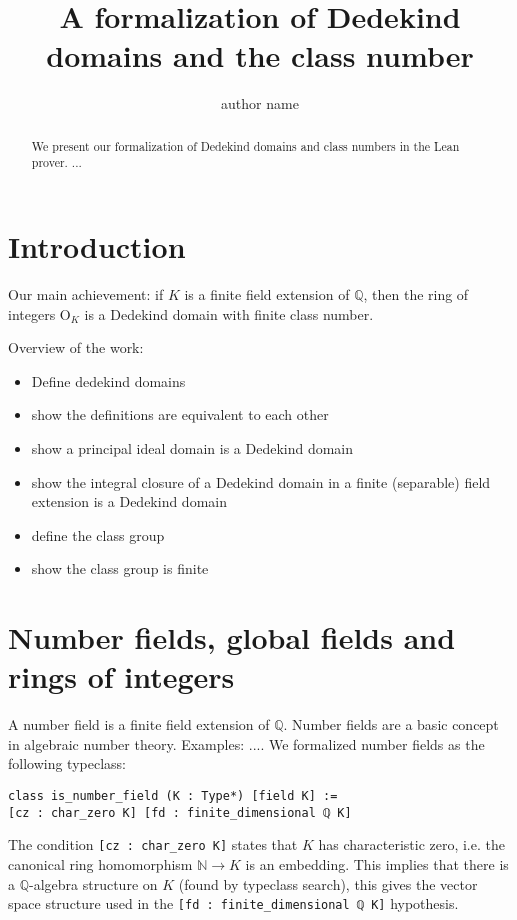 \documentclass{lipics-v2021}
\title{A formalization of Dedekind domains and the class number}
\author{author name}{affiliation}{email}{orcid}{funding}
\newcommand{\lean}[1]{\texttt{#1}\xspace} %
\newcommand{\OK}{\mathrm{O}_K}
\newcommand{\N}{\mathbb{N}}
\newcommand{\Q}{\mathbb{Q}}
\begin{document}
\maketitle

\begin{abstract}
We present our formalization of Dedekind domains and class numbers in the Lean prover. ...
\end{abstract}

\section{Introduction}

Our main achievement: if $K$ is a finite field extension of $\Q$, then the ring of integers $\OK$ is a Dedekind domain with finite class number.

Overview of the work:
\begin{itemize}
 \item Define dedekind domains
 \item show the definitions are equivalent to each other
 \item show a principal ideal domain is a Dedekind domain
 \item show the integral closure of a Dedekind domain in a finite (separable) field extension is a Dedekind domain
 \item define the class group
 \item show the class group is finite
\end{itemize}

\section{Number fields, global fields and rings of integers}

A number field is a finite field extension of $\Q$.
Number fields are a basic concept in algebraic number theory. Examples: ....
We formalized number fields as the following typeclass:
\begin{lstlisting}
class is_number_field (K : Type*) [field K] :=
[cz : char_zero K] [fd : finite_dimensional ℚ K]
\end{lstlisting}
The condition \lean{[cz : char\_zero K]} states that $K$ has characteristic zero, i.e. the canonical ring homomorphism $\N \to K$ is an embedding.
This implies that there is a $\Q$-algebra structure on $K$ (found by typeclass search), this gives the vector space structure used in the \lean{[fd : finite\_dimensional ℚ K]} hypothesis.
\end{document}
